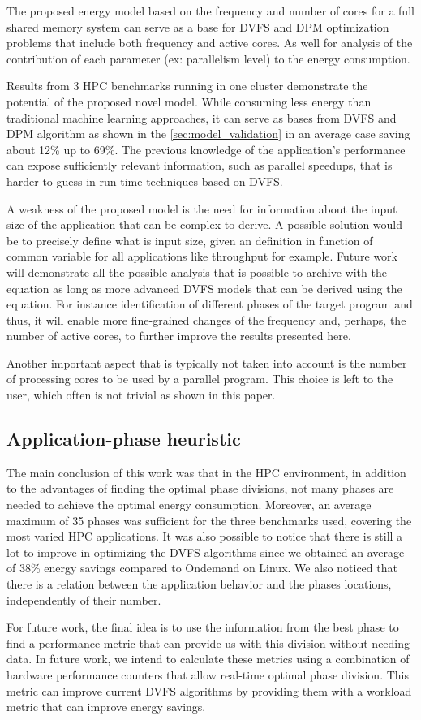 The proposed energy model based on the frequency and number of cores for a full shared memory system can serve as a base for DVFS and DPM optimization problems that include both frequency and active cores. As well for analysis of the contribution of each parameter (ex: parallelism level) to the energy consumption.

Results from 3 HPC benchmarks running in one cluster demonstrate the potential of the proposed novel model. While consuming less energy than traditional machine learning approaches, it can serve as bases from DVFS and DPM algorithm as shown in the \ref{sec:model_validation} in an average case saving about 12\% up to 69\%. The previous knowledge of the application's performance can expose sufficiently relevant information, such as parallel speedups, that is harder to guess in run-time techniques based on DVFS.

A weakness of the proposed model is the need for information about the input size of the application that can be complex to derive. A possible solution would be to precisely define what is input size, given an definition in function of common variable for all applications like throughput for example. Future work will demonstrate all the possible analysis that is possible to archive with the equation as long as more advanced DVFS models that can be derived using the equation. For instance identification of different phases of the target program and thus, it will enable more fine-grained changes of the frequency and, perhaps, the number of active cores, to further improve the results presented here.

Another important aspect that is typically not taken into account is the number of processing cores to be used by a parallel program. This choice is left to the user, which often is not trivial as shown in this paper.


\subsection{Application-phase heuristic} \label{sec:phases_conclusion}
The main conclusion of this work was that in the HPC environment, in addition to the advantages of finding the optimal phase divisions, not many phases are needed to achieve the optimal energy consumption. Moreover, an average maximum of 35 phases was sufficient for the three benchmarks used, covering the most varied HPC applications.
It was also possible to notice that there is still a lot to improve in optimizing the DVFS algorithms since we obtained an average of 38\% energy savings compared to Ondemand on Linux.
We also noticed that there is a relation between the application behavior and the phases locations, independently of their number.

For future work, the final idea is to use the information from the best phase to find a performance metric that can provide us with this division without needing data. In future work, we intend to calculate these metrics using a combination of hardware performance counters that allow real-time optimal phase division. This metric can improve current DVFS algorithms by providing them with a workload metric that can improve energy savings.
